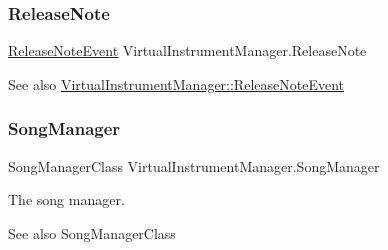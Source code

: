 \subsubsection{\texorpdfstring{Release\+Note}{ReleaseNote}}
{\footnotesize\ttfamily \hyperlink{class_virtual_instrument_manager_1_1_release_note_event}{Release\+Note\+Event} Virtual\+Instrument\+Manager.\+Release\+Note}

\begin{DoxySeeAlso}{See also}
\hyperlink{class_virtual_instrument_manager_1_1_release_note_event}{Virtual\+Instrument\+Manager\+::\+Release\+Note\+Event} 
\end{DoxySeeAlso}
\mbox{\label{group___virtual_instrument_manager_event_types_ga33dae94932c10c66db76a0eebec76b01}} 
\subsubsection{\texorpdfstring{Song\+Manager}{SongManager}}
{\footnotesize\ttfamily Song\+Manager\+Class Virtual\+Instrument\+Manager.\+Song\+Manager}



The song manager. 

\begin{DoxySeeAlso}{See also}
Song\+Manager\+Class 
\end{DoxySeeAlso}
